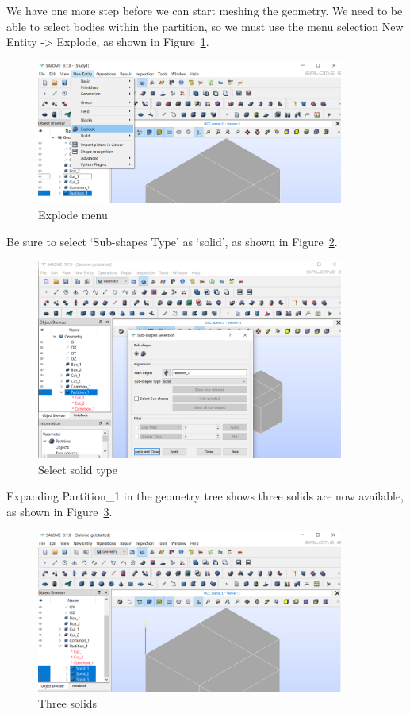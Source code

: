 We have one more step before we can start meshing the geometry.  We need to be able to select bodies within the partition, so we must use the menu selection New Entity -> Explode, as shown in Figure~\ref{fg:salome-14}.

\begin{figure}[H]
\centering
\includegraphics[width=0.9\textwidth]{Salome-14}
\caption{Explode menu}\label{fg:salome-14}
\end{figure}

Be sure to select `Sub-shapes Type' as `solid', as shown in Figure~\ref{fg:salome-15}.

\begin{figure}[H]
\centering
\includegraphics[width=0.9\textwidth]{Salome-15}
\caption{Select solid type}\label{fg:salome-15}
\end{figure}

Expanding Partition\_1 in the geometry tree shows three solids are now available, as shown in Figure~\ref{fg:salome-16}.

\begin{figure}[H]
\centering
\includegraphics[width=0.9\textwidth]{Salome-16}
\caption{Three solids}\label{fg:salome-16}
\end{figure}

